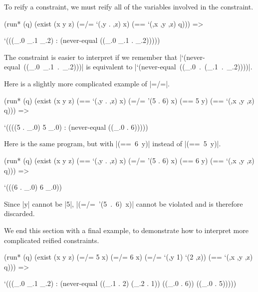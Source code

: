 To reify a constraint, we must reify all of the variables involved in the constraint.

\schemedisplayspace
\begin{schemedisplay}
(run* (q)
  (exist (x y z)
    (=/= `(,y . ,z) x)
    (== `(,x ,y ,z) q))) =>
\end{schemedisplay}
\nspace
\begin{schemeresponse}
`(((_.0 _.1 _.2) : (never-equal ((_.0 _.1 . _.2)))))
\end{schemeresponse}

\noindent The constraint is easier to interpret if we remember that 
\mbox{\scheme|`(never-equal ((_.0 _.1 . _.2)))|} is equivalent to 
\mbox{\scheme|`(never-equal ((_.0 . (_.1 . _.2))))|}.

Here is a slightly more complicated example of \mbox{\scheme|=/=|}.

\schemedisplayspace
\begin{schemedisplay}
(run* (q)
  (exist (x y z)
    (== `(,y . ,z) x)
    (=/= '(5 . 6) x)
    (== 5 y)
    (== `(,x ,y ,z) q))) =>
\end{schemedisplay}
\nspace
\begin{schemeresponse}
`((((5 . _.0) 5 _.0) : (never-equal ((_.0 . 6)))))
\end{schemeresponse}

Here is the same program, but with \mbox{\scheme|(== 6 y)|} instead of \mbox{\scheme|(== 5 y)|}.

\schemedisplayspace
\begin{schemedisplay}
(run* (q)
  (exist (x y z)
    (== `(,y . ,z) x)
    (=/= '(5 . 6) x)
    (== 6 y)
    (== `(,x ,y ,z) q))) =>
\end{schemedisplay}
\nspace
\begin{schemeresponse}
`(((6 . _.0) 6 _.0))
\end{schemeresponse}

\noindent Since \mbox{\scheme|y|} cannot be \mbox{\scheme|5|}, \mbox{\scheme|(=/= '(5 . 6) x)|} cannot be violated and is
therefore discarded.

We end this section with a final example, to demonstrate how to interpret more complicated reified constraints.

\newpage

\begin{schemedisplay}
(run* (q)
  (exist (x y z)
    (=/= 5 x)
    (=/= 6 x)
    (=/= `(,y 1) `(2 ,z))
    (== `(,x ,y ,z) q))) =>
\end{schemedisplay}
\nspace
\begin{schemeresponse}
`(((_.0 _.1 _.2) : (never-equal ((_.1 . 2) (_.2 . 1)) ((_.0 . 6)) ((_.0 . 5)))))
\end{schemeresponse}

